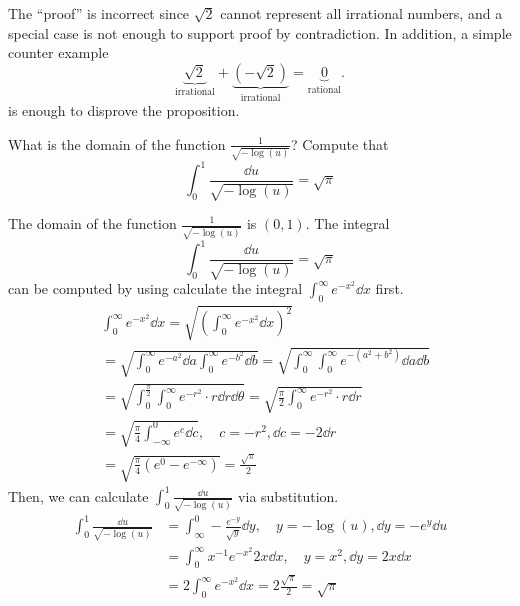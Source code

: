 \documentclass[8pt,twocolumn]{article}
\begin{document}
\begin{Answer}[number=15]
  The ``proof'' is incorrect since $\sqrt{2}$ cannot represent all irrational
  numbers, and a special case is not enough to support proof by contradiction.
  In addition, a simple counter example
  \[\underbrace{\sqrt{2}}_\text{irrational} +
  \underbrace{(-\sqrt{2})}_\text{irrational} = \underbrace{0}_\text{rational}.\]
  is enough to disprove the proposition.
\end{Answer}

\begin{Exercise}[number=16]
  What is the domain of the function $\frac{1}{\sqrt{-\log(u)}}$? Compute that
  \[
    \int_0^1 \frac{\dd{u}}{\sqrt{-\log(u)}} = \sqrt{\pi}
  \]
\end{Exercise}

\begin{Answer}[number=16]
  The domain of the function $\frac{1}{\sqrt{-\log(u)}}$ is $(0,1)$. The
  integral
  \[
    \int_0^1 \frac{\dd{u}}{\sqrt{-\log(u)}} = \sqrt{\pi}
  \]
  can be computed by using calculate the integral $\int_0^\infty
  e^{-x^2}\dd{x}$ first.
  \begin{align*}
    &\int_0^\infty e^{-x^2}\dd{x} = \sqrt{(\int_0^\infty e^{-x^2}\dd{x})^2} \\
    &= \sqrt{\int_0^\infty e^{-a^2}\dd{a}\int_0^\infty e^{-b^2}\dd{b}}
    = \sqrt{\int_0^\infty\int_0^\infty e^{-(a^2+b^2)}\dd{a}\dd{b}} \\
    &= \sqrt{\int_0^\frac{\pi}{2}\int_0^\infty e^{-r^2} \cdot r
    \dd{r}\dd{\theta}}
    = \sqrt{\frac{\pi}{2}\int_0^\infty e^{-r^2} \cdot r \dd{r}} \\
    &= \sqrt{\frac{\pi}{4}\int_{-\infty}^{0} e^c \dd{c}},\quad c =
    -r^2, \dd{c} = -2\dd{r}  \\
    &= \sqrt{\frac{\pi}{4}(e^0-e^{-\infty})} = \frac{\sqrt{\pi}}{2}
  \end{align*}
  Then, we can calculate $\int_0^1 \frac{\dd{u}}{\sqrt{-\log(u)}}$ via
  substitution.
  \begin{align*}
    \int_0^1 \frac{\dd{u}}{\sqrt{-\log(u)}} &= \int_\infty^0
    -\frac{e^{-y}}{\sqrt{y}} \dd{y},\quad y=-\log(u), \dd{y} = -e^y\dd{u} \\
    &= \int_0^\infty x^{-1} e^{-x^2} 2x \dd{x},\quad y=x^2,
    \dd{y}=2x\dd{x} \\
    &= 2\int_0^\infty e^{-x^2} \dd{x} = 2\frac{\sqrt{\pi}}{2} = \sqrt{\pi}
  \end{align*}
\end{Answer}
\end{document}
